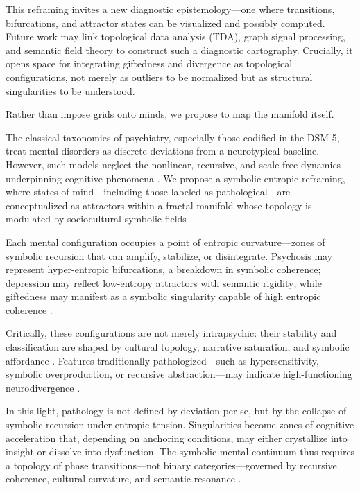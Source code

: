 This reframing invites a new diagnostic epistemology—one where transitions, bifurcations, and attractor states can be visualized and possibly computed. Future work may link topological data analysis (TDA), graph signal processing, and semantic field theory to construct such a diagnostic cartography. Crucially, it opens space for integrating giftedness and divergence as topological configurations, not merely as outliers to be normalized but as structural singularities to be understood.

Rather than impose grids onto minds, we propose to map the manifold itself.

The classical taxonomies of psychiatry, especially those codified in the DSM-5, treat mental disorders as discrete deviations from a neurotypical baseline. However, such models neglect the nonlinear, recursive, and scale-free dynamics underpinning cognitive phenomena \cite{rapp1985, werner2007, goldberger2002}. We propose a symbolic-entropic reframing, where states of mind—including those labeled as pathological—are conceptualized as attractors within a fractal manifold whose topology is modulated by sociocultural symbolic fields \cite{hernandez2023, borsboom2017}.

Each mental configuration occupies a point of entropic curvature—zones of symbolic recursion that can amplify, stabilize, or disintegrate. Psychosis may represent hyper-entropic bifurcations, a breakdown in symbolic coherence; depression may reflect low-entropy attractors with semantic rigidity; while giftedness may manifest as a symbolic singularity capable of high entropic coherence \cite{carhart2014, tagliazucchi2016, silverman2009}.

Critically, these configurations are not merely intrapsychic: their stability and classification are shaped by cultural topology, narrative saturation, and symbolic affordance \cite{deacon2011, lotman1990}. Features traditionally pathologized—such as hypersensitivity, symbolic overproduction, or recursive abstraction—may indicate high-functioning neurodivergence \cite{rinn2012, neihart2002}.

In this light, pathology is not defined by deviation per se, but by the collapse of symbolic recursion under entropic tension. Singularities become zones of cognitive acceleration that, depending on anchoring conditions, may either crystallize into insight or dissolve into dysfunction. The symbolic-mental continuum thus requires a topology of phase transitions—not binary categories—governed by recursive coherence, cultural curvature, and semantic resonance \cite{friston2010, bateson1979, prigogine1980}.

